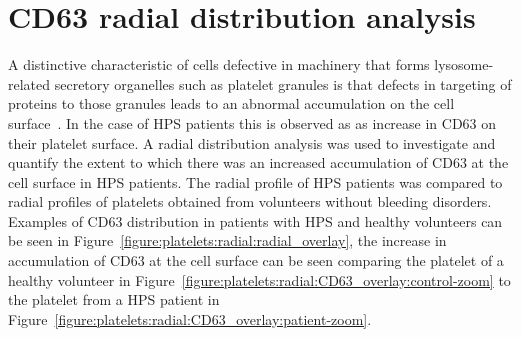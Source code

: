 \section{CD63 radial distribution analysis}
\label{platelets:image_processing:radial}
A distinctive characteristic of cells defective in machinery that forms lysosome-related secretory organelles such as platelet granules is that defects in targeting of proteins to those granules leads to an abnormal accumulation on the cell surface~\cite{DellAngelica1999}. In the case of HPS patients this is observed as as increase in CD63 on their platelet surface. A radial distribution analysis was used to investigate and quantify the extent to which there was an increased accumulation of CD63 at the cell surface in HPS patients. The radial profile of HPS patients was compared to radial profiles of platelets obtained from volunteers without bleeding disorders. Examples of CD63 distribution in patients with HPS and healthy volunteers can be seen in Figure~\ref{figure:platelets:radial:radial_overlay}, the increase in accumulation of CD63 at the cell surface can be seen comparing the platelet of a healthy volunteer in Figure~\ref{figure:platelets:radial:CD63_overlay:control-zoom} to the platelet from a HPS patient in Figure~\ref{figure:platelets:radial:CD63_overlay:patient-zoom}.

